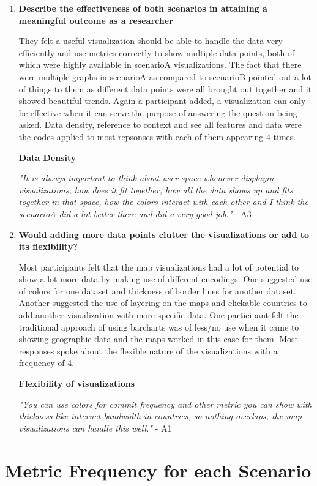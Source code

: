 \documentclass[seploa]{beavtex}
\begin{document}
\begin{enumerate}
\item \textbf{Describe the effectiveness of both scenarios in attaining a meaningful outcome as a researcher}

They felt a useful visualization should be able to handle the data very efficiently and use metrics correctly to show multiple data points, both of which were highly available in scenarioA visualizations. The fact that there were multiple graphs in scenarioA as compared to scenarioB pointed out a lot of things to them as different data points were all brought out together and it showed beautiful trends. Again a participant added, a visualization can only be effective when it can serve the purpose of answering the question being asked. Data density, reference to context and see all features and data were the codes applied to most repsonses with each of them appearing 4 times.

\textbf{Data Density}

{\em "It is always important to think about user space whenever displayin visualizations, how does it fit together, how all the data shows up and fits together in that space, how the colors interact with each other and I think the scenarioA did a lot better there and did a very good job."} - A3

\item \textbf{Would adding more data points clutter the visualizations or add to its flexibility?}

Most participants felt that the map visualizations had a lot of potential to show a lot more data by making use of different encodings. One suggested use of colors for one dataset and thickness of border lines for another dataset. Another suggested the use of layering on the maps and clickable countries to add another visualization with more specific data. One participant felt the traditional approach of using barcharts was of less/no use when it came to showing geographic data and the maps worked in this case for them. Most responses spoke about the flexible nature of the visualizations with a frequency of 4.

\textbf{Flexibility of visualizations}

{\em "You can use colors for commit frequency and other metric you can show with thickness like internet bandwidth in countries, so nothing overlaps, the map visualizations can handle this well."} - A1
\end{enumerate}
\section{Metric Frequency for each Scenario}
\end{document}
